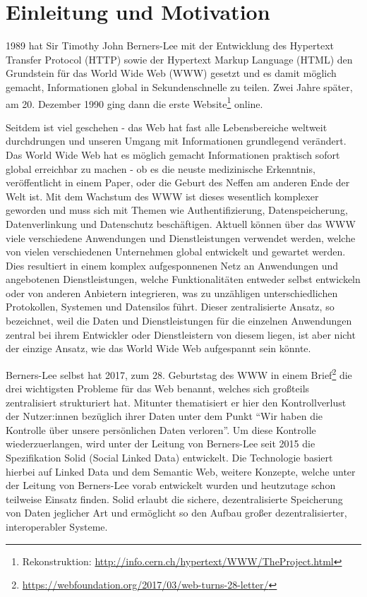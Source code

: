 \documentclass[acmtog]{acmart}
\begin{document}
\section{Einleitung und Motivation}

1989 hat Sir Timothy John Berners-Lee mit der Entwicklung des Hypertext Transfer Protocol (HTTP) sowie der Hypertext Markup Language (HTML) den Grundstein für das World Wide Web (WWW) gesetzt und es damit möglich gemacht, Informationen global in Sekundenschnelle zu teilen.\cite{birth-web} Zwei Jahre später, am 20. Dezember 1990 ging dann die erste Website\footnote{Rekonstruktion: \url{http://info.cern.ch/hypertext/WWW/TheProject.html}} online.

Seitdem ist viel geschehen - das Web hat fast alle Lebensbereiche weltweit durchdrungen und unseren Umgang mit Informationen grundlegend verändert. Das World Wide Web hat es möglich gemacht Informationen praktisch sofort global erreichbar zu machen - ob es die neuste medizinische Erkenntnis, veröffentlicht in einem Paper, oder die Geburt des Neffen am anderen Ende der Welt ist. Mit dem Wachstum des WWW ist dieses wesentlich komplexer geworden und muss sich mit Themen wie Authentifizierung, Datenspeicherung, Datenverlinkung und Datenschutz beschäftigen. Aktuell können über das WWW viele verschiedene Anwendungen und Dienstleistungen verwendet werden, welche von vielen verschiedenen Unternehmen global entwickelt und gewartet werden. Dies resultiert in einem komplex aufgesponnenen Netz an Anwendungen und angebotenen Dienstleistungen, welche Funktionalitäten entweder selbst entwickeln oder von anderen Anbietern integrieren, was zu unzähligen unterschiedlichen Protokollen, Systemen und Datensilos führt. Dieser zentralisierte Ansatz, so bezeichnet, weil die Daten und Dienstleistungen für die einzelnen Anwendungen zentral bei ihrem Entwickler oder Dienstleistern von diesem liegen, ist aber nicht der einzige Ansatz, wie das World Wide Web aufgespannt sein könnte. 

Berners-Lee selbst hat 2017, zum 28. Geburtstag  des WWW in einem Brief\footnote{\url{https://webfoundation.org/2017/03/web-turns-28-letter/}} die drei wichtigsten Probleme für das Web benannt, welches sich großteils zentralisiert strukturiert hat. Mitunter thematisiert er hier den Kontrollverlust der Nutzer:innen bezüglich ihrer Daten unter dem Punkt "`Wir haben die Kontrolle über unsere persönlichen Daten verloren"'. Um diese Kontrolle wiederzuerlangen, wird unter der Leitung von Berners-Lee seit 2015 die Spezifikation Solid (Social Linked Data) entwickelt. Die Technologie basiert hierbei auf Linked Data und dem Semantic Web, weitere Konzepte, welche unter der Leitung von Berners-Lee vorab entwickelt wurden und heutzutage schon teilweise Einsatz finden. Solid erlaubt die sichere, dezentralisierte Speicherung von Daten jeglicher Art und ermöglicht so den Aufbau großer dezentralisierter, interoperabler Systeme.
\end{document}
